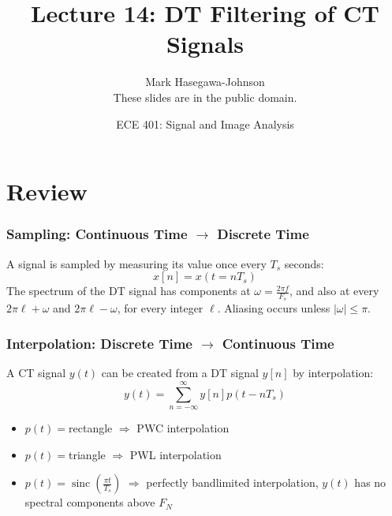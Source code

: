 \documentclass{beamer}
\title{Lecture 14: DT Filtering of CT Signals}
\author{Mark Hasegawa-Johnson\\These slides are in the public domain.}
\date{ECE 401: Signal and Image Analysis}
\DeclareMathOperator{\sinc}{sinc}
\begin{document}
\begin{frame}
  \maketitle
\end{frame}

\begin{frame}
  \tableofcontents
\end{frame}

\section{Review}
\setcounter{subsection}{1}

\begin{frame}
  \frametitle{Sampling: Continuous Time $\rightarrow$ Discrete Time}

  A signal is sampled by measuring its value once every $T_s$ seconds:
  \begin{displaymath}
    x[n] = x(t=nT_s)
  \end{displaymath}
  The spectrum of the DT signal has components at $\omega=\frac{2\pi
    f}{F_s}$, and also at every $2\pi\ell+\omega$ and $2\pi\ell-\omega$, for
  every integer $\ell$.  Aliasing occurs unless $|\omega|\le\pi$.
\end{frame}


\begin{frame}
  \frametitle{Interpolation: Discrete Time $\rightarrow$ Continuous Time}

  A CT signal $y(t)$ can be created from a DT signal $y[n]$ by interpolation:
  \begin{displaymath}
    y(t) = \sum_{n=-\infty}^\infty y[n]p(t-nT_s)
  \end{displaymath}
  \begin{itemize}
  \item $p(t)=$rectangle $\Rightarrow$ PWC interpolation
  \item $p(t)=$triangle $\Rightarrow$ PWL interpolation
  \item $p(t)=\sinc\left(\frac{\pi t}{T_s}\right)$ $\Rightarrow$ perfectly bandlimited interpolation,
    $y(t)$ has no spectral components above $F_N$
  \end{itemize}
\end{frame}
\end{document}
